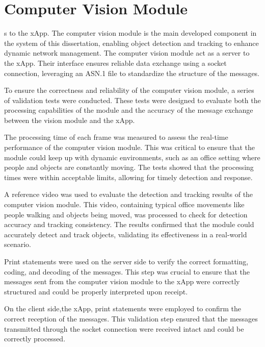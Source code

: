 \section{Computer Vision Module}\label{sec:cv_module}
s to the xApp.
The computer vision module is the main developed component in the system of this dissertation, enabling object detection and tracking to enhance dynamic network management.
The computer vision module act as a server to the xApp.
Their interface ensures reliable data exchange using a socket connection, leveraging an ASN.1 file to standardize the structure of the messages.

To ensure the correctness and reliability of the computer vision module, a series of validation tests were conducted. These tests were designed to evaluate both the processing capabilities of the module and the accuracy of the message exchange between the vision module and the xApp.

The processing time of each frame was measured to assess the real-time performance of the computer vision module. This was critical to ensure that the module could keep up with dynamic environments, such as an office setting where people and objects are constantly moving. The tests showed that the processing times were within acceptable limits, allowing for timely detection and response.

A reference video was used to evaluate the detection and tracking results of the computer vision module. This video, containing typical office movements like people walking and objects being moved, was processed to check for detection accuracy and tracking consistency. The results confirmed that the module could accurately detect and track objects, validating its effectiveness in a real-world scenario.


Print statements were used on the server side to verify the correct formatting, coding, and decoding of the messages.
This step was crucial to ensure that the messages sent from the computer vision module to the xApp were correctly structured and could be properly interpreted upon receipt.

On the client side,the xApp, print statements were employed to confirm the correct reception of the messages. This validation step ensured that the messages transmitted through the socket connection were received intact and could be  correctly processed.


